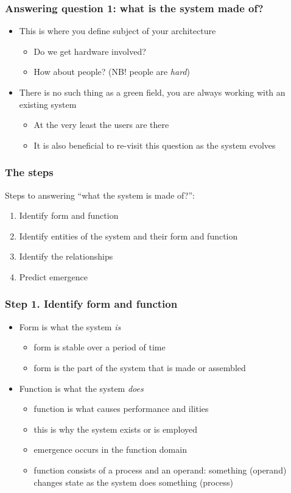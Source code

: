 \documentclass[10pt, compress]{beamer}
\begin{document}
\begin{frame}[fragile]
  \frametitle{Answering question 1: what is the system made of?}
	
  	\begin{itemize}
		\item This is where you define subject of your architecture
		\begin{itemize}
			\item Do we get hardware involved?
			\item How about people? (NB! people are \emph{hard}) 
		\end{itemize}
		\item There is no such thing as a green field, you are always working with an existing system
		\begin{itemize}
			\item At the very least the users are there
			\item It is also beneficial to re-visit this question as the system evolves
		\end{itemize}
	\end{itemize}
\end{frame}

\begin{frame}[fragile]
  \frametitle{The steps}
	Steps to answering \enquote{what the system is made of?}:
		\begin{enumerate}
			\item Identify form and function
			\item Identify entities of the system and their form and function
			\item Identify the relationships
			\item Predict emergence
		\end{enumerate}
		
\end{frame}

\begin{frame}[fragile]
  \frametitle{Step 1. Identify form and function}
  \begin{itemize}
  	\item Form is what the system \emph{is}
	\begin{itemize}
		\item form is stable over a period of time
		\item form is the part of the system that is made or assembled
	\end{itemize}
	\item Function is what the system \emph{does}
	\begin{itemize}
		\item function is what causes performance and ilities
		\item this is why the system exists or is employed
		\item emergence occurs in the function domain
		\item function consists of a process and an operand: something (operand) changes state as the system does something (process)
	\end{itemize}
  \end{itemize}
	
	
\end{frame}
\end{document}
